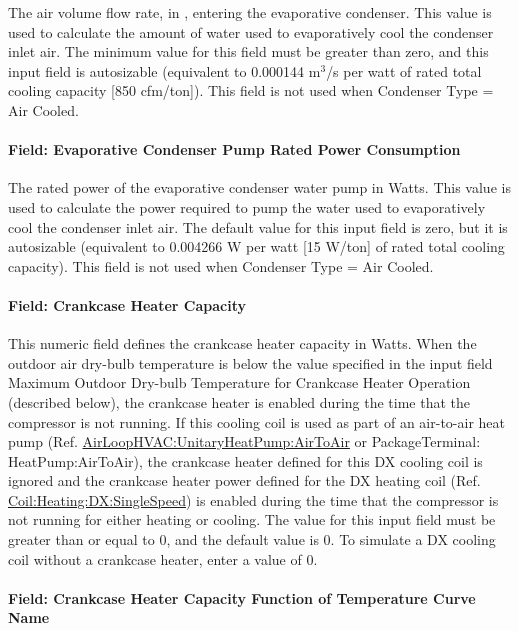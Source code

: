 The air volume flow rate, in \si{\volumeFlowRate}, entering the evaporative condenser. This value is used to calculate the amount of water used to evaporatively cool the condenser inlet air. The minimum value for this field must be greater than zero, and this input field is autosizable (equivalent to 0.000144 m\(^{3}\)/s per watt of rated total cooling capacity {[}850 cfm/ton{]}). This field is not used when Condenser Type = Air Cooled.

\paragraph{Field: Evaporative Condenser Pump Rated Power Consumption}\label{field-evaporative-condenser-pump-rated-power-consumption}

The rated power of the evaporative condenser water pump in Watts. This value is used to calculate the power required to pump the water used to evaporatively cool the condenser inlet air. The default value for this input field is zero, but it is autosizable (equivalent to 0.004266 W per watt {[}15 W/ton{]} of rated total cooling capacity). This field is not used when Condenser Type = Air Cooled.

\paragraph{Field: Crankcase Heater Capacity}\label{field-crankcase-heater-capacity}

This numeric field defines the crankcase heater capacity in Watts. When the outdoor air dry-bulb temperature is below the value specified in the input field Maximum Outdoor Dry-bulb Temperature for Crankcase Heater Operation (described below), the crankcase heater is enabled during the time that the compressor is not running. If this cooling coil is used as part of an air-to-air heat pump (Ref. \hyperref[airloophvacunitaryheatpumpairtoair]{AirLoopHVAC:UnitaryHeatPump:AirToAir} or PackageTerminal: HeatPump:AirToAir), the crankcase heater defined for this DX cooling coil is ignored and the crankcase heater power defined for the DX heating coil (Ref. \hyperref[coilheatingdxsinglespeed]{Coil:Heating:DX:SingleSpeed}) is enabled during the time that the compressor is not running for either heating or cooling. The value for this input field must be greater than or equal to 0, and the default value is 0. To simulate a DX cooling coil without a crankcase heater, enter a value of 0.

\paragraph{Field: Crankcase Heater Capacity Function of Temperature Curve Name}

